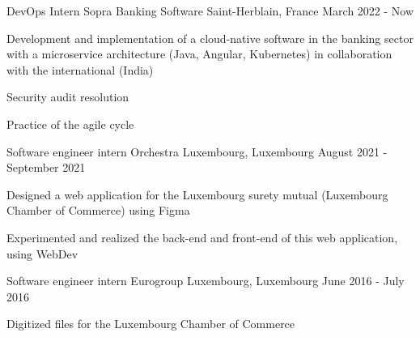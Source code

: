 
\begin{cventries}
  \cventry
    {DevOps Intern} %
    {Sopra Banking Software} %
    {Saint-Herblain, France} %
    {March 2022 - Now} %
    {
      \begin{cvitems} %
        \item {Development and implementation of a cloud-native software in the banking sector with a microservice architecture (Java, Angular, Kubernetes) in collaboration with the international (India)}
        \item {Security audit resolution}
        \item {Practice of the agile cycle}
      \end{cvitems}
    }
    
  \cventry
    {Software engineer intern} %
    {Orchestra} %
    {Luxembourg, Luxembourg} %
    {August 2021 - September 2021} %
    {
      \begin{cvitems} %
        \item {Designed a web application for the Luxembourg surety mutual (Luxembourg Chamber of Commerce) using Figma}
        \item {Experimented and realized the back-end and front-end of this web application, using WebDev}
      \end{cvitems}
    }

  \cventry
    {Software engineer intern} %
    {Eurogroup} %
    {Luxembourg, Luxembourg} %
    {June 2016 - July 2016} %
    {
      \begin{cvitems} %
        \item {Digitized files for the Luxembourg Chamber of Commerce}
      \end{cvitems}
    }

\end{cventries}
